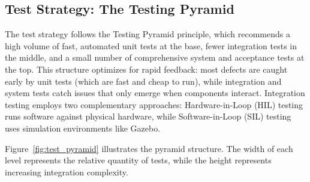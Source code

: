 \subsection{Test Strategy: The Testing Pyramid}

The test strategy follows the Testing Pyramid principle, which recommends a high volume of fast, automated unit tests at the base, fewer integration tests in the middle, and a small number of comprehensive system and acceptance tests at the top. This structure optimizes for rapid feedback: most defects are caught early by unit tests (which are fast and cheap to run), while integration and system tests catch issues that only emerge when components interact. Integration testing employs two complementary approaches: Hardware-in-Loop (HIL) testing runs software against physical hardware, while Software-in-Loop (SIL) testing uses simulation environments like Gazebo.

Figure~\ref{fig:test_pyramid} illustrates the pyramid structure. The width of each level represents the relative quantity of tests, while the height represents increasing integration complexity.

